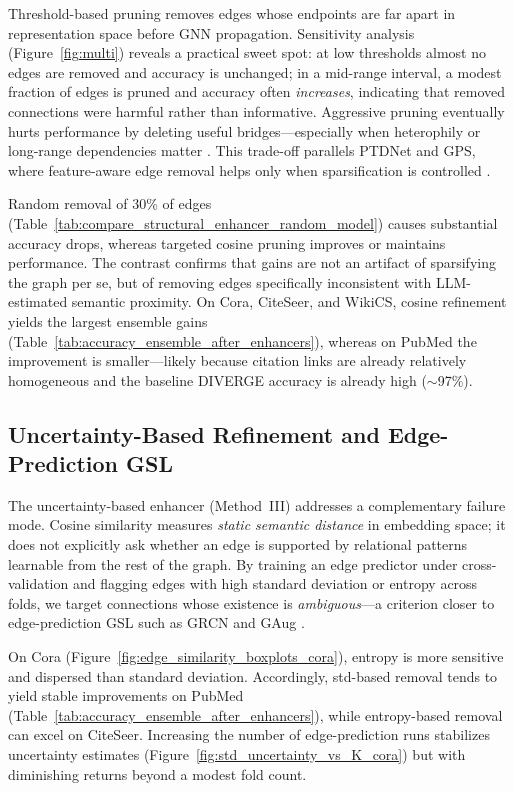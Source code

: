 Threshold-based pruning removes edges whose endpoints are far apart in representation
space before GNN propagation. Sensitivity analysis (Figure~\ref{fig:multi}) reveals a
practical sweet spot: at low thresholds almost no edges are removed and accuracy is
unchanged; in a mid-range interval, a modest fraction of edges is pruned and accuracy
often \emph{increases}, indicating that removed connections were harmful rather than
informative. Aggressive pruning eventually hurts performance by deleting useful
bridges---especially when heterophily or long-range dependencies matter
\citep{dong2023gps}. This trade-off parallels PTDNet and GPS, where feature-aware edge
removal helps only when sparsification is controlled \citep{luo2021ptdnet,dong2023gps}.

Random removal of 30\% of edges
(Table~\ref{tab:compare_structural_enhancer_random_model}) causes substantial accuracy
drops, whereas targeted cosine pruning improves or maintains performance. The contrast
confirms that gains are not an artifact of sparsifying the graph per se, but of removing
edges specifically inconsistent with LLM-estimated semantic proximity. On Cora, CiteSeer,
and WikiCS, cosine refinement yields the largest ensemble gains
(Table~\ref{tab:accuracy_ensemble_after_enhancers}), whereas on PubMed the improvement
is smaller---likely because citation links are already relatively homogeneous and the
baseline DIVERGE accuracy is already high ($\sim$97\%).


\subsection{Uncertainty-Based Refinement and Edge-Prediction GSL}
\label{sec:disc-uncertainty}

The uncertainty-based enhancer (Method~III) addresses a complementary failure mode.
Cosine similarity measures \emph{static semantic distance} in embedding space; it does
not explicitly ask whether an edge is supported by relational patterns learnable from
the rest of the graph. By training an edge predictor under cross-validation and flagging
edges with high standard deviation or entropy across folds, we target connections whose
existence is \emph{ambiguous}---a criterion closer to edge-prediction GSL such as GRCN
and GAug \citep{yu2020grcn,zhao2021gaug}.

On Cora (Figure~\ref{fig:edge_similarity_boxplots_cora}), entropy is more sensitive and
dispersed than standard deviation. Accordingly, std-based removal tends to yield stable
improvements on PubMed (Table~\ref{tab:accuracy_ensemble_after_enhancers}), while
entropy-based removal can excel on CiteSeer. Increasing the number of edge-prediction
runs stabilizes uncertainty estimates (Figure~\ref{fig:std_uncertainty_vs_K_cora}) but
with diminishing returns beyond a modest fold count.

